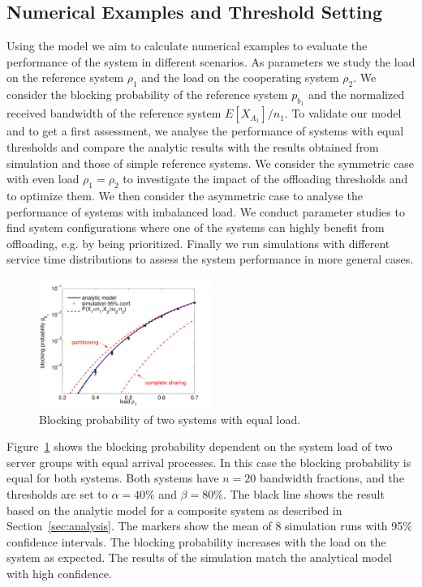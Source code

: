 \subsection{Numerical Examples and Threshold Setting}\label{sec:aggregation:performance_model:numerical_examples}

Using the model we aim to calculate numerical examples to evaluate the performance of the system in different scenarios.
As parameters we study the load on the reference system $\rho_1$ and the load on the cooperating system $\rho_2$.
We consider the blocking probability of the reference system $p_{b_1}$ and the normalized received bandwidth of the reference system $E[X_{A_1}]/n_1$.
To validate our model and to get a first assessment, we analyse the performance of systems with equal thresholds and compare the analytic results with the results obtained from simulation and those of simple reference systems.
We consider the symmetric case with even load $\rho_1=\rho_2$ to investigate the impact of the offloading thresholds and to optimize them.
We then consider the asymmetric case to analyse the performance of systems with imbalanced load.
We conduct parameter studies to find system configurations where one of the systems can highly benefit from offloading, e.g. by being prioritized.
Finally we run simulations with different service time distributions to assess the system performance in more general cases.

\begin{figure}[tb]
	\centering
	\includegraphics[width=0.5\textwidth]{aggregation/performance_model/figures/m2_n20_comp}
 	\caption{Blocking probability of two systems with equal load.}
 	\label{fig:m2_comp}
\end{figure}

Figure~\ref{fig:m2_comp} shows the blocking probability dependent on the system load of two server groups with equal arrival processes.
In this case the blocking probability is equal for both systems. Both systems have $n=20$ bandwidth fractions, and the thresholds are set to $\alpha=40\%$ and $\beta=80\%$.
The black line shows the result based on the analytic model for a composite system as described in Section~\ref{sec:analysis}.
The markers show the mean of 8 simulation runs with 95\% confidence intervals.
The blocking probability increases with the load on the system as expected.
The results of the simulation match the analytical model with high confidence.

